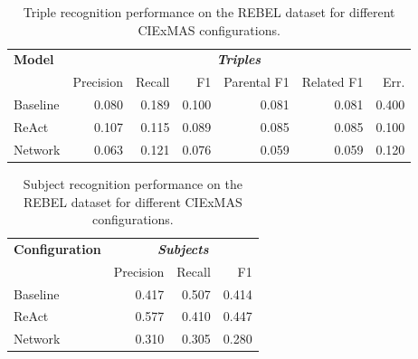 \documentclass[a4paper,oneside,bibliography=totoc]{scrbook}
\begin{document}
\begin{table}[h]
  \centering
  \begin{tabular}{l|rrrrrr}
    \toprule
    \textbf{Model} & \multicolumn{6}{c}{\textit{\textbf{Triples}}}                                                     \\
                   & Precision                                     & Recall & F1    & Parental F1 & Related F1 & Err.  \\
    \midrule
    Baseline       & 0.080                                         & 0.189  & 0.100 & 0.081       & 0.081      & 0.400 \\
    ReAct          & 0.107                                         & 0.115  & 0.089 & 0.085       & 0.085      & 0.100 \\
    Network        & 0.063                                         & 0.121  & 0.076 & 0.059       & 0.059      & 0.120 \\
    \bottomrule
  \end{tabular}
  \caption{Triple recognition performance on the REBEL dataset for different CIExMAS configurations.}
  \label{tab:rebel_comprehensive_results}
\end{table}

\begin{table}[h]
  \centering
  \begin{tabular}{l|rrr}
    \toprule
    \textbf{Configuration} & \multicolumn{3}{c}{\textit{\textbf{Subjects}}}                  \\
                           & Precision                                      & Recall & F1    \\
    \midrule
    Baseline               & 0.417                                          & 0.507  & 0.414 \\
    ReAct                  & 0.577                                          & 0.410  & 0.447 \\
    Network                & 0.310                                          & 0.305  & 0.280 \\
    \bottomrule
  \end{tabular}
  \caption{Subject recognition performance on the REBEL dataset for different CIExMAS configurations.}
  \label{tab:rebel_subjects}
\end{table}
\end{document}
